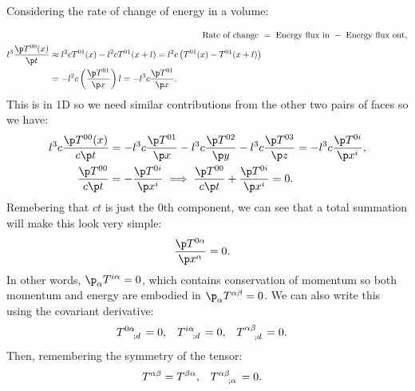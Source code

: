 \documentclass[a4paper, 11pt, normalem]{report}
\begin{document}
Considering the rate of change of energy in a volume:
\begin{figure}[H]
    \centering
    \vspace{-40pt}
\end{figure}
\begin{align}
    \text{Rate of change } &= \text{ Energy flux in } - \text{ Energy flux out},\\
    \begin{split}
        l^3\frac{\p T^{00}(x)}{\p t} &\approx l^2cT^{01}(x) - l^2cT^{01}(x+l) = l^2c\left(T^{01}(x) - T^{01}(x+l)\right) \\
                                     &= -l^2c\left(\frac{\p T^{01}}{\p x}\right)l = -l^3c\frac{\p T^{01}}{\p x}.
    \end{split}
\end{align}
This is in 1D so we need similar contributions from the other two pairs of faces so we have:
\begin{align}
    l^3c\frac{\p T^{00}(x)}{c\p t} &= -l^3c\frac{\p T^{01}}{\p x} - l^3c\frac{\p T^{02}}{\p y} - l^3c\frac{\p T^{03}}{\p z} = -l^3c\frac{\p T^{0i}}{\p x^i}, \\
    \frac{\p T^{00}}{c\p t} &= -\frac{\p T^{0i}}{\p x^i} \implies \frac{\p T^{00}}{c\p t} + \frac{\p T^{0i}}{\p x^i} = 0.
\end{align}
Remebering that $ct$ is just the 0th component, we can see that a total summation will make this look very simple:
\begin{align}
    \frac{\p T^{0\alpha}}{\p x^\alpha} &= 0.
\end{align}
In other words, $\p_\alpha T^{i\alpha} = 0$, which contains conservation of momentum so both momentum and energy are embodied in $\p_\alpha T^{\alpha\beta} = 0$.
We can also write this using the covariant derivative:
\begin{align}
    \tensor{T}{^{0\alpha}_{;d}} &= 0, & \tensor{T}{^{i\alpha}_{;d}} &= 0, & \tensor{T}{^{\alpha\beta}_{;d}} &= 0.
\end{align}
Then, remembering the symmetry of the tensor:
\begin{align}
    T^{\alpha\beta} &= T^{\beta\alpha}, & \tensor{T}{^{\alpha\beta}_{;\alpha}} &= 0.
\end{align}
\end{document}
